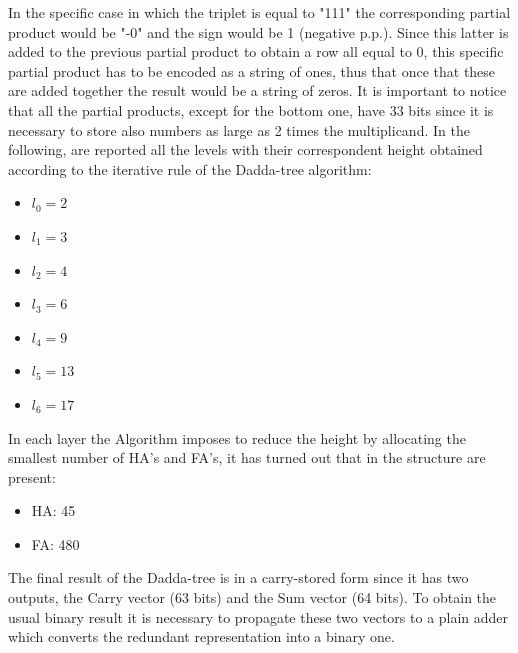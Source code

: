 \documentclass[a4paper, titlepage]{article}
\begin{document}
\newline
In the specific case in which the triplet is equal to "111" the corresponding partial product would be "-0" and the sign would be 1 (negative p.p.). Since this latter is added to the previous partial product to obtain a row all equal to 0,
this specific partial product has to be encoded as a string of ones, thus that once that these are added together the result would be a string of zeros.
\newline
It is important to notice that all the partial products, except for the bottom one, have 33 bits since it is necessary to store also numbers as large as 2 times the multiplicand.
\newline
In the following, are reported all the levels with their correspondent height obtained according to the iterative rule of the Dadda-tree algorithm:
\begin{itemize}
    \item $l_0=2$
    \item $l_1=3$
    \item $l_2=4$
    \item $l_3=6$
    \item $l_4=9$
    \item $l_5=13$
    \item $l_6=17$
    
\end{itemize}
In each layer the Algorithm imposes to reduce the height by allocating the smallest number of HA's and FA's, it has turned out that in the structure are present:
\begin{itemize}
    \item HA: 45
    \item FA: 480
\end{itemize}
The final result of the Dadda-tree is in a carry-stored form since it has two outputs, the Carry vector (63 bits) and the Sum vector (64 bits).
\newline To obtain the usual binary result it is necessary to propagate these two vectors to a plain adder which converts the redundant representation into a binary one.
    
\end{document}

